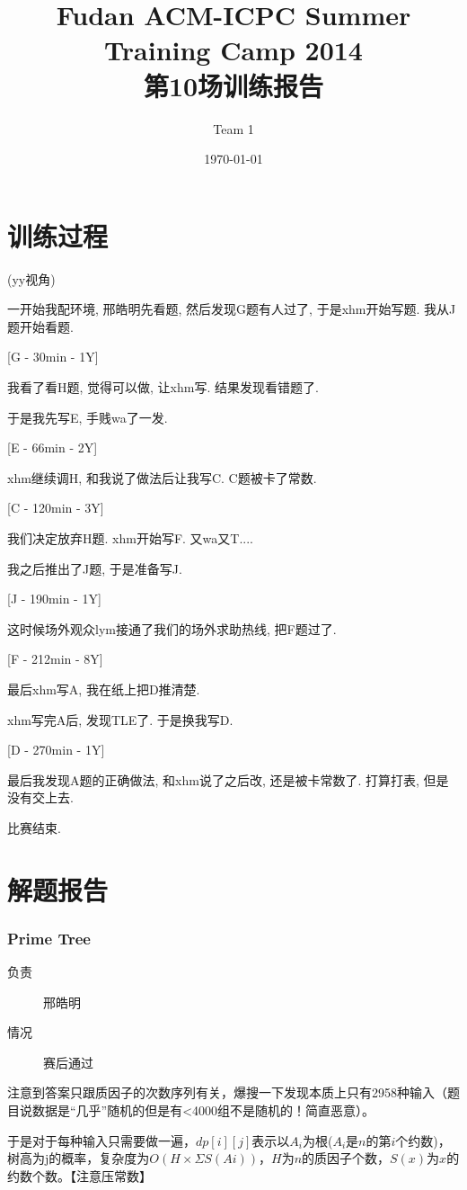 \documentclass[a4paper, 11pt, nofonts, nocap, fancyhdr]{ctexart}
\title{Fudan ACM-ICPC Summer Training Camp 2014\\第10场训练报告}
\author{Team 1}
\date{\today}
\newcommand{\problem}[1]{\subsubsection{#1}}
\begin{document}
\maketitle

\section{训练过程}

(yy视角)

一开始我配环境, 邢皓明先看题, 然后发现G题有人过了, 于是xhm开始写题. 我从J题开始看题.

[G - 30min - 1Y]

我看了看H题, 觉得可以做, 让xhm写. 结果发现看错题了.

于是我先写E, 手贱wa了一发.

[E - 66min - 2Y]

xhm继续调H, 和我说了做法后让我写C. C题被卡了常数. 

[C - 120min - 3Y]

我们决定放弃H题. xhm开始写F. 又wa又T....

我之后推出了J题, 于是准备写J. 

[J - 190min - 1Y]

这时候场外观众lym接通了我们的场外求助热线, 把F题过了. 

[F - 212min - 8Y]

最后xhm写A, 我在纸上把D推清楚.

xhm写完A后, 发现TLE了. 于是换我写D. 

[D - 270min - 1Y]

最后我发现A题的正确做法, 和xhm说了之后改, 还是被卡常数了. 打算打表, 但是没有交上去.

比赛结束.

\section{解题报告}

\problem{Prime Tree}

\begin{description}
\item[负责] 邢皓明
\item[情况] 赛后通过
\end{description}

注意到答案只跟质因子的次数序列有关，爆搜一下发现本质上只有2958种输入（题目说数据是“几乎”随机的但是有<4000组不是随机的！简直恶意）。

于是对于每种输入只需要做一遍，$dp[i][j]$表示以$A_i$为根($A_i$是$n$的第$i$个约数)，树高为j的概率，复杂度为$O(H \times ΣS(Ai))$，$H$为$n$的质因子个数，$S(x)$为$x$的约数个数。【注意压常数】
\end{document}
